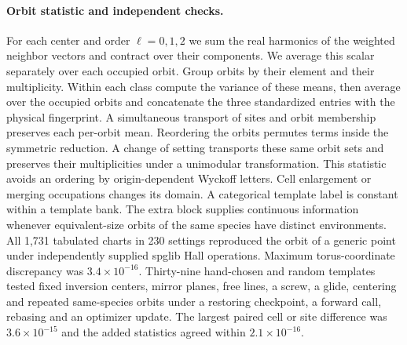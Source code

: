 \paragraph{Orbit statistic and independent checks.}
For each center and order $\ell=0,1,2$ we sum the real harmonics of the weighted neighbor vectors and contract over their components. We average this scalar separately over each occupied orbit. Group orbits by their element and their multiplicity. Within each class compute the variance of these means, then average over the occupied orbits and concatenate the three standardized entries with the physical fingerprint. A simultaneous transport of sites and orbit membership preserves each per-orbit mean. Reordering the orbits permutes terms inside the symmetric reduction. A change of setting transports these same orbit sets and preserves their multiplicities under a unimodular transformation. This statistic avoids an ordering by origin-dependent Wyckoff letters. Cell enlargement or merging occupations changes its domain. A categorical template label is constant within a template bank. The extra block supplies continuous information whenever equivalent-size orbits of the same species have distinct environments.
All 1,731 tabulated charts in 230 settings reproduced the orbit of a generic point under independently supplied spglib Hall operations. Maximum torus-coordinate discrepancy was $3.4\times10^{-16}$. Thirty-nine hand-chosen and random templates tested fixed inversion centers, mirror planes, free lines, a screw, a glide, centering and repeated same-species orbits under a restoring checkpoint, a forward call, rebasing and an optimizer update. The largest paired cell or site difference was $3.6\times10^{-15}$ and the added statistics agreed within $2.1\times10^{-16}$.

